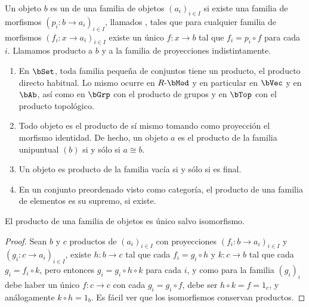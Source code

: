 

\begin{definition}
  Un objeto $b$ es un  de una familia de objetos $(a_i)_{i\in I}$
  si existe una familia de morfismos $(p_i:b\to a_i)_{i\in I}$, llamados
  , tales que para cualquier familia de morfismos
  $(f_i:x\to a_i)_{i\in I}$ existe un único $f:x\to b$ tal que $f_i=p_i\circ f$
  para cada $i$. Llamamos producto a $b$ y a la familia de proyecciones
  indistintamente.
\end{definition}

\begin{example}\;
  \begin{enumerate}
  \item En $\bSet$, toda familia pequeña de conjuntos tiene un producto, el
    producto directo habitual. Lo mismo ocurre en $R\dash\bMod$ y en particular
    en $\bVec$ y en $\bAb$, así como en $\bGrp$ con el producto de grupos y en
    $\bTop$ con el producto topológico.
  \item Todo objeto es el producto de sí mismo tomando como proyección el
    morfismo identidad. De hecho, un objeto $a$ es el producto de la familia
    unipuntual $(b)$ si y sólo si $a\cong b$.
  \item Un objeto es producto de la familia vacía si y sólo si es final.
  \item En un conjunto preordenado visto como categoría, el producto de una
    familia de elementos es su supremo, si existe.
  \end{enumerate}
\end{example}

\begin{proposition}
  El producto de una familia de objetos es único salvo isomorfismo.
\end{proposition}
\begin{proof}
  Sean $b$ y $c$ productos de $(a_i)_{i\in I}$ con proyecciones
  $(f_i:b\to a_i)_{i\in I}$ y $(g_i:c\to a_i)_{i\in I}$, existe $h:b\to c$ tal
  que cada $f_i=g_i\circ h$ y $k:c\to b$ tal que cada $g_i=f_i\circ k$, pero
  entonces $g_i=g_i\circ h\circ k$ para cada $i$, y como para la familia
  $(g_i)_i$ debe haber un único $f:c\to c$ con cada $g_i=g_i\circ f$, debe ser
  $h\circ k=f=1_c$, y análogamente $k\circ h=1_b$. Es fácil ver que los
  isomorfismos conservan productos.
\end{proof}

